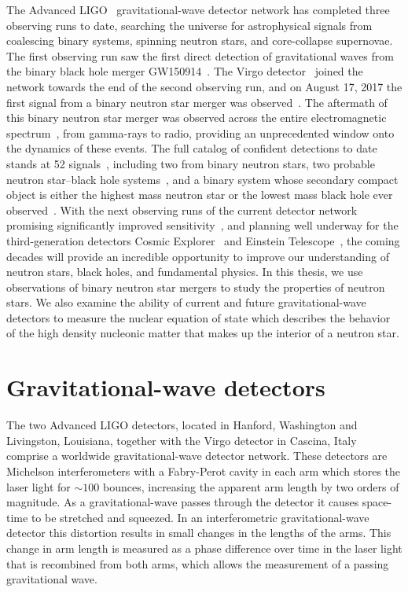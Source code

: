The Advanced LIGO~\cite{TheLIGOScientific:2014jea} gravitational-wave detector network has completed three observing runs to date, searching the universe for astrophysical signals from coalescing binary systems, spinning neutron stars, and core-collapse supernovae. The first observing run saw the first direct detection of gravitational waves from the binary black hole merger GW150914~\cite{Abbott:2016blz}. The Virgo detector~\cite{TheVirgo:2014hva} joined the network towards the end of the second observing run, and on August 17, 2017 the first signal from a binary neutron star merger was observed~\cite{TheLIGOScientific:2017qsa}. The aftermath of this binary neutron star merger was observed across the entire electromagnetic spectrum~\cite{GBM:2017lvd}, from gamma-rays to radio, providing an unprecedented window onto the dynamics of these events. The full catalog of confident detections to date stands at 52 signals~\cite{LIGOScientific:2018mvr,LIGOScientific:2020ibl}, including two from binary neutron stars, two probable neutron star--black hole systems~\cite{LIGOScientific:2021qlt}, and a binary system whose secondary compact object is either the highest mass neutron star or the lowest mass black hole ever observed~\cite{LIGOScientific:2020zkf}. With the next observing runs of the current detector network promising significantly improved sensitivity~\cite{Aasi:2013wya}, and planning well underway for the third-generation detectors Cosmic Explorer~\cite{Reitze:2019iox} and Einstein Telescope~\cite{Punturo:2010zz}, the coming decades will provide an incredible opportunity to improve our understanding of neutron stars, black holes, and fundamental physics. In this thesis, we use observations of binary neutron star mergers to study the properties of neutron stars. We also examine the ability of current and future gravitational-wave detectors to measure the nuclear equation of state which describes the behavior of the high density nucleonic matter that makes up the interior of a neutron star.

\section{Gravitational-wave detectors}
The two Advanced LIGO detectors, located in Hanford, Washington and Livingston, Louisiana, together with the Virgo detector in Cascina, Italy comprise a worldwide gravitational-wave detector network. These detectors are Michelson interferometers with a Fabry-Perot cavity in each arm which stores the laser light for $\sim 100$ bounces, increasing the apparent arm length by two orders of magnitude. As a gravitational-wave passes through the detector it causes space-time to be stretched and squeezed. In an interferometric gravitational-wave detector this distortion results in small changes in the lengths of the arms. This change in arm length is measured as a phase difference over time in the laser light that is recombined from both arms, which allows the measurement of a passing gravitational wave.


